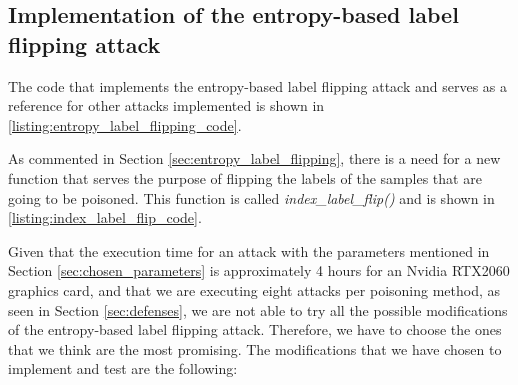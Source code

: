 \subsection{Implementation of the entropy-based label flipping attack}
The code that implements the entropy-based label flipping attack and serves as a reference for other attacks implemented is shown in \autoref{listing:entropy_label_flipping_code}.

As commented in Section \ref{sec:entropy_label_flipping}, there is a need for a new function that serves the purpose of flipping the labels of the samples that are going to be poisoned. This function is called \textit{index\_label\_flip()} and is shown in \autoref{listing:index_label_flip_code}.

Given that the execution time for an attack with the parameters mentioned in Section \ref{sec:chosen_parameters} is approximately 4 hours for an Nvidia RTX2060 graphics card, and that we are executing eight attacks per poisoning method, as seen in Section \ref{sec:defenses}, we are not able to try all the possible modifications of the entropy-based label flipping attack. Therefore, we have to choose the ones that we think are the most promising. 
The modifications that we have chosen to implement and test are the following:
